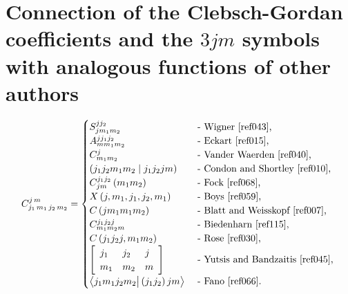 \section[Relation to other authors]{Connection of the Clebsch-Gordan coefficients and the $3 jm$ symbols with analogous functions of other authors}\label{sec:8.11}
\[
C_{j_{1}\,m_{1}\,j_{2}\,m_{2}}^{j\,m}= \begin{cases}S_{j m_{1} m_{2}}^{j j_{2}} & \text { - Wigner \cite{ref043}, } \\
A_{m m_{1} m_{2}}^{j j_{1} j_{2}} & \text { - Eckart \cite{ref015}, } \\
C_{m_{1} m_{2}}^{j} & \text { - Vander Waerden \cite{ref040}, } \\
\left(j_{1} j_{2} m_{1} m_{2} \mid j_{1} j_{2} j m\right) & \text { - Condon and Shortley \cite{ref010}, } \\
C_{j m}^{j_{1} j_{2}}\left(m_{1} m_{2}\right) & \text { - Fock \cite{ref068}, } \\
X\left(j, m_{1}, j_{1}, j_{2}, m_{1}\right) & \text { - Boys \cite{ref059}, } \\
C\left(j m_{1} m_{1} m_{2}\right) & \text { - Blatt and Weisskopf \cite{ref007}, } \\
C_{m_{1} m_{2} m}^{j_{1} j_{2} j} & \text { - Biedenharn \cite{ref115}, } \\
C\left(j_{1} j_{2} j, m_{1} m_{2}\right) & \text { - Rose \cite{ref030}, } \\
{\left[\begin{array}{lll}
j_{1} & j_{2} & j \\
m_{1} & m_{2} & m
\end{array}\right]} & \text { - Yutsis and Bandzaitis \cite{ref045}, } \\
\bigl\langle j_{1} m_{1} j_{2} m_{2} \big| \left(j_{1} j_{2}\right) j m \bigr\rangle & \text { - Fano \cite{ref066}. }\end{cases}
\]
